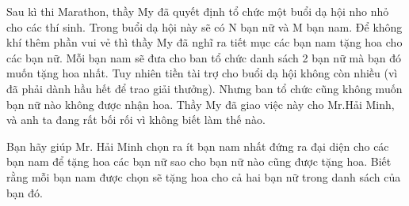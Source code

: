 Sau kì thi Marathon, thầy My đã quyết định tổ chức một buổi dạ hội nho nhỏ cho các thí sinh. Trong buổi dạ hội này sẽ có N bạn nữ và M bạn nam. Để không khí thêm phần vui vẻ thì thầy My đã nghĩ ra tiết mục các bạn nam tặng hoa cho các bạn nữ. Mỗi bạn nam sẽ đưa cho ban tổ chức danh sách 2 bạn nữ mà bạn đó muốn tặng hoa nhất. Tuy nhiên tiền tài trợ cho buổi dạ hội không còn nhiều (vì đã phải dành hầu hết để trao giải thưởng). Nhưng ban tổ chức cũng không muốn bạn nữ nào không được nhận hoa. Thầy My đã giao việc này cho Mr.Hải Minh, và anh ta đang rất bối rối vì không biết làm thế nào.  

   Bạn hãy giúp Mr. Hải Minh chọn ra ít bạn nam nhất đứng ra đại diện cho các bạn nam để tặng hoa các bạn nữ sao cho bạn nữ nào cũng được tặng hoa. Biết rằng mỗi bạn nam được chọn sẽ tặng hoa cho cả hai bạn nữ trong danh sách của bạn đó.  

\